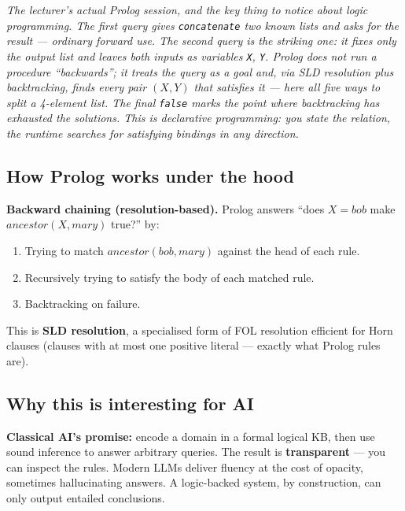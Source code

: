 \documentclass[11pt, a4paper]{article}
\begin{document}
\begin{center}

\footnotesize\textit{The lecturer's actual Prolog session, and the key thing to notice about logic programming. The first query gives \texttt{concatenate} two known lists and asks for the result — ordinary forward use. The second query is the striking one: it fixes only the \emph{output} list and leaves both inputs as variables \texttt{X}, \texttt{Y}. Prolog does not run a procedure ``backwards''; it treats the query as a goal and, via SLD resolution plus backtracking, finds \emph{every} pair $(X, Y)$ that satisfies it — here all five ways to split a 4-element list. The final \texttt{false} marks the point where backtracking has exhausted the solutions. This is declarative programming: you state the relation, the runtime searches for satisfying bindings in any direction.}
\end{center}

\subsection{How Prolog works under the hood}

\textbf{Backward chaining (resolution-based).} Prolog answers ``does $X = bob$ make $ancestor(X, mary)$ true?'' by:
\begin{enumerate}
  \item Trying to match $ancestor(bob, mary)$ against the head of each rule.
  \item Recursively trying to satisfy the body of each matched rule.
  \item Backtracking on failure.
\end{enumerate}

This is \textbf{SLD resolution}, a specialised form of FOL resolution efficient for Horn clauses (clauses with at most one positive literal — exactly what Prolog rules are).

\subsection{Why this is interesting for AI}

\textbf{Classical AI's promise:} encode a domain in a formal logical KB, then use sound inference to answer arbitrary queries. The result is \textbf{transparent} — you can inspect the rules. Modern LLMs deliver fluency at the cost of opacity, sometimes hallucinating answers. A logic-backed system, by construction, can only output entailed conclusions.
\end{document}
